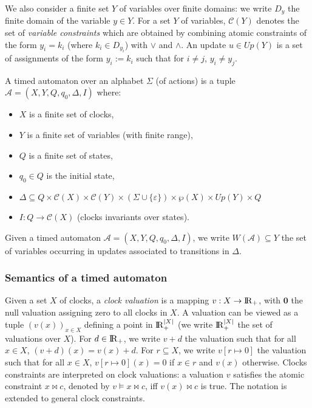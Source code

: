 \documentclass[a4paper,10pt]{article}
\def\A{\ensuremath{\mathcal{A}}}
\def\C{\ensuremath{\mathcal{C}}}
\def\bbbr{{\rm I\!R }}
\begin{document}
We also consider a finite set $Y$ of variables over finite domains: we
write $D_y$ the finite domain of the variable $y \in Y$. 
For a set $Y$ of variables,
$\C(Y)$ denotes the set of \emph{variable constraints}
which are 
obtained by combining atomic constraints of the form $y_i = k_i$ (where
$k_i \in D_{y_i}$) with
$\lor$ and $\land$.
An update $u \in Up(Y)$ is a set of assignments of the form $y_i :=
k_i$ such that for $i \neq j$, $y_i \neq y_j$.



A timed automaton over an alphabet $\Sigma$ (of actions) is a tuple $\A=(X,Y,Q,q_0,\Delta,I)$ where:
\begin{itemize}
\item $X$ is a finite set of clocks,
\item $Y$ is a finite set of variables (with finite range),
\item $Q$ is a finite set of states,
\item $q_0 \in Q$ is the initial state,
\item $\Delta \subseteq Q \times \C(X) \times \C(Y) \times (\Sigma
  \cup \{ \varepsilon \}) \times \wp(X) \times Up(Y) \times Q$
\item $I : Q \to \C(X)$ (clocks invariants over states).
\end{itemize}


Given a timed automaton $\A=(X,Y,Q,q_0,\Delta,I)$, we write $W(\A)
\subseteq Y$
the set of variables occurring in updates associated to transitions in $\Delta$.

\subsubsection*{Semantics of a timed automaton}


Given a set $X$ of clocks, a \emph{clock valuation} is a mapping $v : X \to
\bbbr_+$, with $\mathbf{0}$ the null valuation assigning zero to all
clocks in $X$. 
A valuation can be viewed as a tuple $(v(x))_{x \in X}$ defining a
point in $\bbbr_{+}^{|X|}$
(we write $\bbbr_{+}^{|X|}$ the set of valuations over $X$).
For $d \in \bbbr_+$, we write $v+d$ the valuation such
that for all $x \in X$, $(v+d)(x) = v(x) + d$. For $r \subseteq X$, we
write $v[r \mapsto 0]$ the valuation such
that for all $x \in X$, $v[r \mapsto 0](x) =0$ if $x \in r$ and $v(x)$
otherwise. Clocks constraints are interpreted on clock valuations: a
valuation $v$ satisfies the atomic constraint $x \bowtie c$, denoted by
$v \models x \bowtie c$, iff $v(x) \bowtie c$ is true. The notation is
extended to general clock constraints. 
\end{document}
